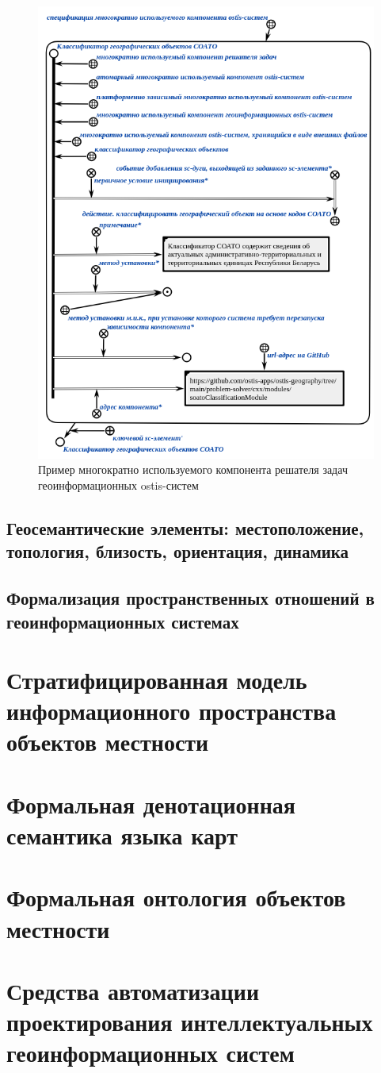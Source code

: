 \begin{figure}[H]
	\includegraphics[scale=0.8]{author/part7/figures/gis_ps_component.png}
	\caption{Пример многократно используемого компонента решателя задач геоинформационных ostis-систем}
	\label{fig:gis_ps_component}
\end{figure}

\subsection{Геосемантические элементы: местоположение, топология, близость, ориентация, динамика}
\subsection{Формализация пространственных отношений в геоинформационных системах}
\section{Стратифицированная модель информационного пространства объектов местности}
\section{Формальная денотационная семантика языка карт}
\section{Формальная онтология объектов местности}
\section{Средства автоматизации проектирования интеллектуальных геоинформационных систем}

%